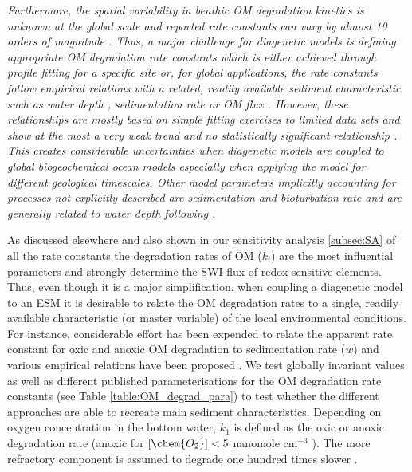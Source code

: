 \documentclass[gmd, manuscript]{copernicus}
\begin{document}
\textit{Furthermore, the spatial variability in benthic OM degradation kinetics is unknown at the global scale and reported rate constants can vary by almost 10 orders of magnitude \citep{arndt_quantifying_2013}.
Thus, a major challenge for diagenetic models is defining appropriate OM degradation rate constants which is either achieved 
through profile fitting for a specific site or, for global applications, the rate constants follow empirical relations with a related, readily available sediment characteristic such as water depth 
\citep{middelburg_empirical_1997}, sedimentation rate \citep{toth_organic_1977, tromp_global_1995} or OM flux \citep{boudreau1997diagenetic}. 
However, these relationships are mostly based on simple fitting exercises to limited data sets and show at the most a very weak trend and no statistically significant relationship \citep{arndt_quantifying_2013}. 
This creates considerable uncertainties when diagenetic models are coupled to global biogeochemical ocean models especially when applying the model for different geological timescales. %
Other model parameters implicitly accounting for processes not explicitly described are sedimentation and bioturbation rate and are generally related to water depth following \citet{middelburg_empirical_1997}.
}

As discussed elsewhere \citep[e.g.][and references therein]{arndt_quantifying_2013} and also shown in our sensitivity analysis \ref{subsec:SA} of all the rate constants the 
degradation rates of OM ($k_i$) are the most influential parameters and strongly determine the SWI-flux of redox-sensitive elements. 
Thus, even though it is a major simplification, when coupling a diagenetic model to an ESM it is desirable to relate the OM degradation rates to a single, readily available 
characteristic (or master variable) of the local environmental conditions. For instance, considerable effort has been expended to relate the apparent rate constant for oxic and 
anoxic OM degradation to sedimentation rate ($w$) and various empirical relations have been proposed \citep{toth_organic_1977, tromp_global_1995, boudreau1997diagenetic, stolpovsky_toward_2015}. 
We test globally invariant values as well as different published parameterisations for the OM degradation rate constants (see Table \ref{table:OM_degrad_para}) to test 
whether the different approaches are able to recreate main sediment characteristics. %
Depending on oxygen concentration in the bottom water, $k_1$ is defined as the oxic or anoxic degradation rate (anoxic for $[\chem{O_2}] < 5$ nanomole cm$^{-3}$ ). 
The more refractory component is assumed to degrade one hundred times slower \citep[$k_2 = k_1/100$, see e.g.][]{boudreau1997diagenetic}. 
\end{document}
